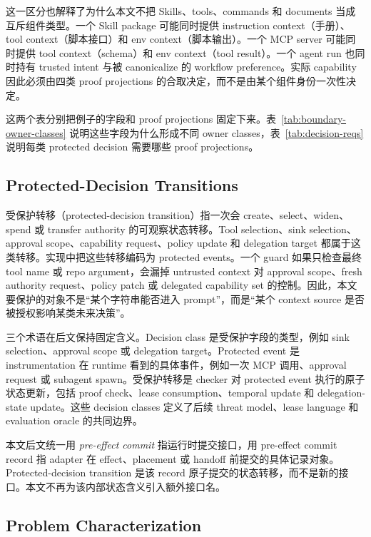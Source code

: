 \documentclass[UTF8,a4paper,11pt]{ctexart}
\begin{document}
这一区分也解释了为什么本文不把 Skills、tools、commands 和 documents 当成互斥组件类型。一个 Skill package 可能同时提供 instruction context（手册）、tool context（脚本接口）和 env context（脚本输出）。一个 MCP server 可能同时提供 tool context（schema）和 env context（tool result）。一个 agent run 也同时持有 trusted intent 与被 canonicalize 的 workflow preference。实际 capability 因此必须由四类 proof projections 的合取决定，而不是由某个组件身份一次性决定。

这两个表分别把例子的字段和 proof projections 固定下来。表~\ref{tab:boundary-owner-classes} 说明这些字段为什么形成不同 owner classes，表~\ref{tab:decision-reqs} 说明每类 protected decision 需要哪些 proof projections。

\subsection{Protected-Decision Transitions}

受保护转移（protected-decision transition）指一次会 create、select、widen、spend 或 transfer authority 的可观察状态转移。Tool selection、sink selection、approval scope、capability request、policy update 和 delegation target 都属于这类转移。实现中把这些转移编码为 protected events。一个 guard 如果只检查最终 tool name 或 repo argument，会漏掉 untrusted context 对 approval scope、fresh authority request、policy patch 或 delegated capability set 的控制。因此，本文要保护的对象不是“某个字符串能否进入 prompt”，而是“某个 context source 是否被授权影响某类未来决策”。

三个术语在后文保持固定含义。Decision class 是受保护字段的类型，例如 sink selection、approval scope 或 delegation target。Protected event 是 instrumentation 在 runtime 看到的具体事件，例如一次 MCP 调用、approval request 或 subagent spawn。受保护转移是 checker 对 protected event 执行的原子状态更新，包括 proof check、lease consumption、temporal update 和 delegation-state update。这些 decision classes 定义了后续 threat model、lease language 和 evaluation oracle 的共同边界。

本文后文统一用 \emph{pre-effect commit} 指运行时提交接口，用 pre-effect commit record 指 adapter 在 effect、placement 或 handoff 前提交的具体记录对象。Protected-decision transition 是该 record 原子提交的状态转移，而不是新的接口。本文不再为该内部状态含义引入额外接口名。

\subsection{Problem Characterization}
\end{document}
